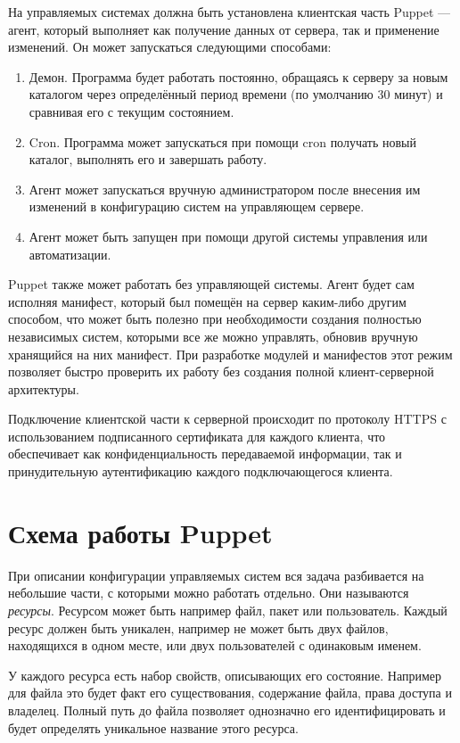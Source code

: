 На управляемых системах должна быть установлена клиентская часть Puppet — агент, который выполняет как получение данных от сервера, так и применение изменений. Он может запускаться следующими способами:

\begin{enumerate}
\item Демон. Программа будет работать постоянно, обращаясь к серверу за новым каталогом через определённый период времени (по умолчанию 30 минут) и сравнивая его с текущим состоянием.
\item Cron. Программа может запускаться при помощи cron получать новый каталог, выполнять его и завершать работу.
\item Агент может запускаться вручную администратором после внесения им изменений в конфигурацию систем на управляющем сервере.
\item Агент может быть запущен при помощи другой системы управления или автоматизации.
\end{enumerate}

Puppet также может работать без управляющей системы. Агент будет сам исполняя манифест, который был помещён на сервер каким-либо другим способом, что может быть полезно при необходимости создания полностью независимых систем, которыми все же можно управлять, обновив вручную хранящийся на них манифест. При разработке модулей и манифестов этот режим позволяет быстро проверить их работу без создания полной клиент-серверной архитектуры.

Подключение клиентской части к серверной происходит по протоколу HTTPS с использованием подписанного сертификата для каждого клиента, что обеспечивает как конфиденциальность передаваемой информации, так и принудительную аутентификацию каждого подключающегося клиента.

\section{Схема работы Puppet}

При описании конфигурации управляемых систем вся задача разбивается на небольшие части, с которыми можно работать отдельно. Они называются \textit{ресурсы}. Ресурсом может быть например файл, пакет или пользователь. Каждый ресурс должен быть уникален, например не может быть двух файлов, находящихся в одном месте, или двух пользователей с одинаковым именем.

У каждого ресурса есть набор свойств, описывающих его состояние. Например для файла это будет факт его существования, содержание файла, права доступа и владелец. Полный путь до файла позволяет однозначно его идентифицировать и будет определять уникальное название этого ресурса.


